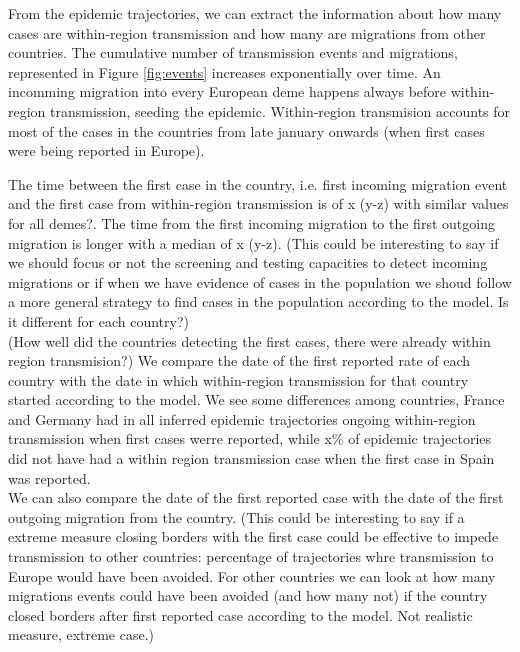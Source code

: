 \documentclass[12pt]{article}
\begin{document}

From the epidemic trajectories, we can extract the information about how many cases are within-region transmission and how many are migrations from other countries. The cumulative number of transmission events and migrations, represented in Figure \ref{fig:events} increases exponentially over time. An incomming migration into every European deme happens always before within-region transmission, seeding the epidemic. Within-region transmision accounts for most of the cases in the countries from late january onwards (when first cases were being reported in Europe).


The time between the first case in the country, i.e. first incoming migration event and the first case from within-region transmission is of x  (y-z) with similar values for all demes?. The time from the first incoming migration to the first outgoing migration is longer with a median of x (y-z). (This could be interesting to say if we should focus or not the screening and testing capacities to detect incoming migrations or if when we have evidence of cases in the population we shoud follow a more general strategy to find cases in the population according to the model. Is it different for each country?)\\

(How well did the countries detecting the first cases, there were already within region transmision?) We compare the date of the first reported rate of each country with the date in which within-region transmission for that country started according to the model. We see some differences among countries, France and Germany had in all inferred epidemic trajectories ongoing within-region transmission when first cases werre reported, while x\% of epidemic trajectories did not have had a within region transmission case when the first case in Spain was reported.\\

We can also compare the date of the first reported case with the date of the first outgoing migration from the country. (This could be interesting to say if a extreme measure closing borders with the first case could be effective to impede transmission to other countries: percentage of trajectories whre transmission to Europe would have been avoided. For other countries we can look at how many migrations events could have been avoided (and how many not) if the country closed borders after first reported case according to the model. Not realistic measure, extreme case.)\\ 
\end{document}

